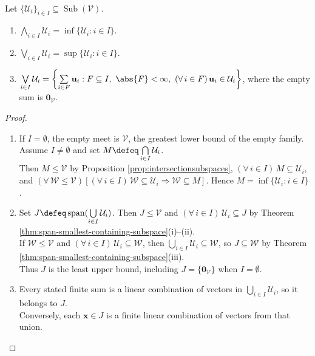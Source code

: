 \begin{proposition} \label{prop:subspaces-form-complete-lattice} \\
Let $\{\mathcal{U}_i\}_{i\in I}\subseteq\operatorname{Sub}(\mathcal{V})$.
\begin{enumerate}[label=(\roman*)]
\setlength{\itemsep}{0pt}
\item $\bigwedge\limits_{i\in I}\mathcal{U}_i=\inf\limits\{\mathcal{U}_i:i\in I\}$.
\item $\bigvee\limits_{i\in I}\mathcal{U}_i=\sup\limits\{\mathcal{U}_i:i\in I\}$.
\item $\bigvee\limits_{i\in I}\mathcal{U}_i=\left\{\sum\limits_{i\in F}\mathbf{u}_i:F\subseteq I,\ \abs{F}<\infty,\ (\forall\,i\in F)\,\mathbf{u}_i\in\mathcal{U}_i\right\}$, where the empty sum is $\mathbf{0}_{\mathcal{V}}$.
\end{enumerate}
\begin{proof}
\begin{enumerate}[label=(\roman*)]
\setlength{\itemsep}{0pt}
\item If $I=\emptyset$, the empty meet is $\mathcal{V}$, the greatest lower bound of the empty family. Assume $I\neq\emptyset$ and set $M\defeq\bigcap\limits_{i\in I}\mathcal{U}_i$.\\
Then $M\leq\mathcal{V}$ by Proposition \ref{prop:intersectionsubspaces}, $(\forall\,i\in I)\,M\subseteq\mathcal{U}_i$, and $(\forall\,\mathcal{W}\leq\mathcal{V})[(\forall\,i\in I)\,\mathcal{W}\subseteq\mathcal{U}_i\Rightarrow\mathcal{W}\subseteq M]$. Hence $M=\inf\limits\{\mathcal{U}_i:i\in I\}$.
\item Set $J\defeq\operatorname{span}(\bigcup\limits_{i\in I}\mathcal{U}_i)$. Then $J\leq\mathcal{V}$ and $(\forall\,i\in I)\,\mathcal{U}_i\subseteq J$ by Theorem \ref{thm:span-smallest-containing-subspace}(i)--(ii).\\
If $\mathcal{W}\leq\mathcal{V}$ and $(\forall\,i\in I)\,\mathcal{U}_i\subseteq\mathcal{W}$, then $\bigcup\limits_{i\in I}\mathcal{U}_i\subseteq\mathcal{W}$, so $J\subseteq\mathcal{W}$ by Theorem \ref{thm:span-smallest-containing-subspace}(iii).\\
Thus $J$ is the least upper bound, including $J=\{\mathbf{0}_{\mathcal{V}}\}$ when $I=\emptyset$.
\item Every stated finite sum is a linear combination of vectors in $\bigcup\limits_{i\in I}\mathcal{U}_i$, so it belongs to $J$.\\
Conversely, each $\mathbf{x}\in J$ is a finite linear combination of vectors from that union.\\

\end{enumerate}
\end{proof}
\end{proposition}
